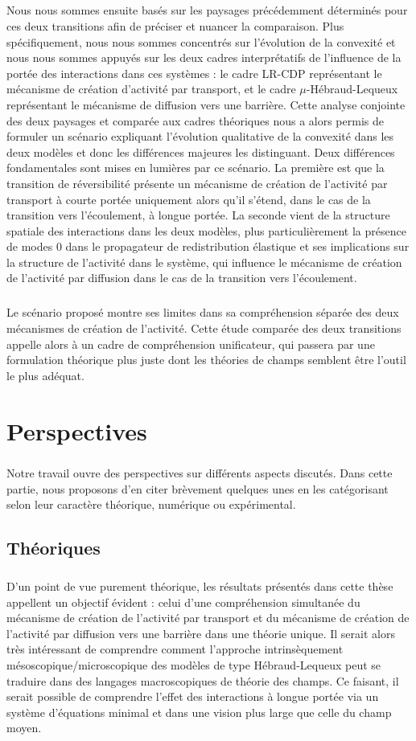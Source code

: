 \subparagraph{}Nous nous sommes ensuite basés sur les paysages précédemment déterminés pour ces deux transitions afin de préciser et nuancer la comparaison. Plus spécifiquement, nous nous sommes concentrés sur l'évolution de la convexité et nous nous sommes appuyés sur les deux cadres interprétatifs de l'influence de la portée des interactions dans ces systèmes : le cadre LR-CDP représentant le mécanisme de création d'activité par transport, et le cadre $\mu$-Hébraud-Lequeux représentant le mécanisme de diffusion vers une barrière. Cette analyse conjointe des deux paysages et comparée aux cadres théoriques nous a alors permis de formuler un scénario expliquant l'évolution qualitative de la convexité dans les deux modèles et donc les différences majeures les distinguant. Deux différences fondamentales sont mises en lumières par ce scénario. La première est que la transition de réversibilité présente un mécanisme de création de l'activité par transport à courte portée uniquement alors qu'il s'étend, dans le cas de la transition vers l'écoulement, à longue portée. La seconde vient de la structure spatiale des interactions dans les deux modèles, plus particulièrement la présence de modes 0 dans le propagateur de redistribution élastique et ses implications sur la structure de l'activité dans le système, qui influence le mécanisme de création de l'activité par diffusion dans le cas de la transition vers l'écoulement.

\subparagraph{}Le scénario proposé montre ses limites dans sa compréhension séparée des deux mécanismes de création de l'activité. Cette étude comparée des deux transitions appelle alors à un cadre de compréhension unificateur, qui passera par une formulation théorique plus juste dont les théories de champs semblent être l'outil le plus adéquat.

\section*{Perspectives}

\subparagraph{}Notre travail ouvre des perspectives sur différents aspects discutés. Dans cette partie, nous proposons d'en citer brèvement quelques unes en les catégorisant selon leur caractère théorique, numérique ou expérimental.

\subsection*{Théoriques}

\subparagraph{}D'un point de vue purement théorique, les résultats présentés dans cette thèse appellent un objectif évident : celui d'une compréhension simultanée du mécanisme de création de l'activité par transport et du mécanisme de création de l'activité par diffusion vers une barrière dans une théorie unique. Il serait alors très intéressant de comprendre comment l'approche intrinsèquement mésoscopique/microscopique des modèles de type Hébraud-Lequeux peut se traduire dans des langages macroscopiques de théorie des champs. Ce faisant, il serait possible de comprendre l'effet des interactions à longue portée via un système d'équations minimal et dans une vision plus large que celle du champ moyen.

